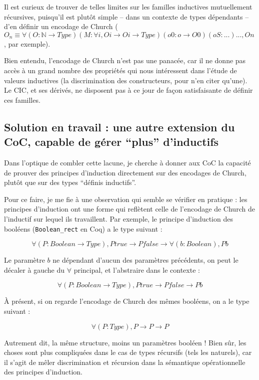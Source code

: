 \documentclass[]{easychair}
\begin{document}
Il est curieux de trouver de telles limites sur les familles inductives
mutuellement récursives, puisqu'il est plutôt simple -- dans un contexte
de types dépendants -- d'en définir un encodage de Church
(\(O_{n} \equiv \forall (O:\mathbb{N} \rightarrow Type) (M:\forall i, O i \rightarrow O i \rightarrow Type) (o0 : o \rightarrow O 0) (oS : ...) ..., O n\),
par exemple).

Bien entendu, l'encodage de Church n'est pas une panacée, car il ne
donne pas accès à un grand nombre des propriétés qui nous intéressent
dans l'étude de valeurs inductives (la discrimination des constructeurs,
pour n'en citer qu'une). Le CIC, et ses dérivés, ne disposent pas à ce
jour de façon satisfaisante de définir ces familles.

\subsection{\texorpdfstring{Solution en travail : une autre extension du
CoC, capable de gérer ``plus''
d'inductifs}{Solution en travail : une autre extension du CoC, capable de gérer plus d'inductifs}}\label{solution-en-travail-une-autre-extension-du-coc-capable-de-guxe9rer-plus-dinductifs}

Dans l'optique de combler cette lacune, je cherche à donner aux CoC la
capacité de prouver des principes d'induction directement sur des
encodages de Church, plutôt que sur des types ``définis inductifs''.

Pour ce faire, je me fie à une observation qui semble se vérifier en
pratique : les principes d'induction ont une forme qui reflètent celle
de l'encodage de Church de l'inductif sur lequel ils travaillent. Par
exemple, le principe d'induction des booléens (\texttt{Boolean\_rect} en
Coq) a le type suivant :

\[
\forall (P:Boolean \rightarrow Type), P true \rightarrow P false \rightarrow \forall (b:Boolean), P b
\]

Le paramètre \(b\) ne dépendant d'aucun des paramètres précédents, on
peut le décaler à gauche du \(\forall\) principal, et l'abstraire dans
le contexte :

\[
\forall (P:Boolean \rightarrow Type), P true \rightarrow P false \rightarrow P b
\]

À présent, si on regarde l'encodage de Church des mêmes booléens, on a
le type suivant :

\[
\forall (P:Type), P \rightarrow P \rightarrow P
\]

Autrement dit, la même structure, moins un paramètres booléen ! Bien
sûr, les choses sont plus compliquées dans le cas de types récursifs
(tels les naturels), car il s'agit de mêler discrimination et récursion
dans la sémantique opérationnelle des principes d'induction.
\end{document}
